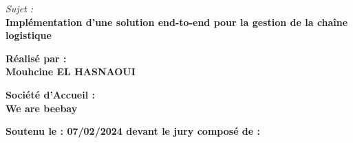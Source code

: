 \begin{titlepage}
\vspace{0.8cm}

{\large \textit{Sujet :}}\\[0.3cm]
{\huge \textbf{\textcolor{primaryColor}{Implémentation d’une solution end-to-end pour la gestion de la chaîne logistique}}}\\[1cm]

\begin{minipage}[t]{0.45\textwidth}
    \begin{flushleft}
        {\large \textbf{Réalisé par :}}\\[0.1cm]
        {\Large \textbf{Mouhcine EL HASNAOUI}}
    \end{flushleft}
\end{minipage}
\hfill
\begin{minipage}[t]{0.45\textwidth}
    \begin{flushright}
        {\large \textbf{Société d’Accueil :}}\\[0.1cm]
        {\Large \textbf{\textcolor{secondaryColor}{We are beebay}}}
    \end{flushright}
\end{minipage}

\vfill

\begin{minipage}{\textwidth}
    \centering
    {\small \textbf{Soutenu le : 07/02/2024 devant le jury composé de :}}\\[0.4cm]
    \begin{tabular}{p{4.5cm} p{6cm} l}
    \end{tabular}
\end{minipage}

\end{titlepage}
\restoregeometry

